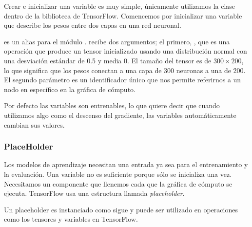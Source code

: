 Crear e inicializar una variable es muy simple,
únicamente utilizamos la clase 
dentro de la biblioteca de TensorFlow.
Comencemos por inicializar una variable
que describe los pesos entre dos capas en una red neuronal.

\begin{sphinxVerbatim}[commandchars=\\\{\}]
  \PYG{p}{[} \PYG{p}{]} 
\end{sphinxVerbatim}

 es un alias para el módulo .
 recibe dos argumentos; el primero,
, que es una operación que
produce un tensor inicializado usando una
distribución normal con una desviación estándar de
0.5 y media 0. El tamaño del tensor es de $300 \times
200$, lo que significa que los pesos conectan a una
capa de 300 neuronas a una de 200. El segundo
parámetro es un identificador único que nos
permite referirnos a un nodo en específico en
la gráfica de cómputo.

Por defecto las variables son entrenables,
lo que quiere decir que cuando utilizamos algo
como el descenso del gradiente, las variables
automáticamente cambian sus valores.


\subsubsection{PlaceHolder}

Los modelos de aprendizaje necesitan una entrada ya sea 
para el entrenamiento y la evaluación. Una variable no es 
suficiente porque sólo se inicializa una vez. Necesitamos un
componente que llenemos cada que la gráfica de cómputo se ejecuta.
TensorFlow usa una estructura llamada \textit{placeholder}. 

Un placeholder es instanciado como sigue y puede ser utilizado en operaciones como los tensores
y variables en TensorFlow.

